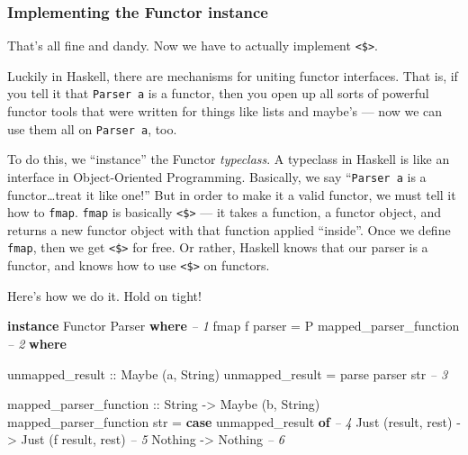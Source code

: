 \documentclass[]{article}
\newenvironment{Shaded}{}{}
\newcommand{\KeywordTok}[1]{\textcolor[rgb]{0.00,0.44,0.13}{\textbf{{#1}}}}
\newcommand{\DataTypeTok}[1]{\textcolor[rgb]{0.56,0.13,0.00}{{#1}}}
\newcommand{\CommentTok}[1]{\textcolor[rgb]{0.38,0.63,0.69}{\textit{{#1}}}}
\newcommand{\OtherTok}[1]{\textcolor[rgb]{0.00,0.44,0.13}{{#1}}}
\newcommand{\FunctionTok}[1]{\textcolor[rgb]{0.02,0.16,0.49}{{#1}}}
\newcommand{\NormalTok}[1]{{#1}}
\begin{document}
\subsubsection{Implementing the Functor
instance}\label{implementing-the-functor-instance}

That's all fine and dandy. Now we have to actually implement
\texttt{\textless{}\$\textgreater{}}.

Luckily in Haskell, there are mechanisms for uniting functor interfaces.
That is, if you tell it that \texttt{Parser\ a} is a functor, then you
open up all sorts of powerful functor tools that were written for things
like lists and maybe's --- now we can use them all on
\texttt{Parser\ a}, too.

To do this, we ``instance'' the Functor \emph{typeclass}. A typeclass in
Haskell is like an interface in Object-Oriented Programming. Basically,
we say ``\texttt{Parser\ a} is a functor\ldots{}treat it like one!'' But
in order to make it a valid functor, we must tell it how to
\texttt{fmap}. \texttt{fmap} is basically
\texttt{\textless{}\$\textgreater{}} --- it takes a function, a functor
object, and returns a new functor object with that function applied
``inside''. Once we define \texttt{fmap}, then we get
\texttt{\textless{}\$\textgreater{}} for free. Or rather, Haskell knows
that our parser is a functor, and knows how to use
\texttt{\textless{}\$\textgreater{}} on functors.

Here's how we do it. Hold on tight!

\begin{Shaded}
\begin{Highlighting}[]
\KeywordTok{instance} \DataTypeTok{Functor} \DataTypeTok{Parser} \KeywordTok{where}                                       \CommentTok{-- 1}
    \NormalTok{fmap f parser }\FunctionTok{=} \DataTypeTok{P} \NormalTok{mapped_parser_function                        }\CommentTok{-- 2}
        \KeywordTok{where}

\OtherTok{            unmapped_result ::} \DataTypeTok{Maybe} \NormalTok{(a, }\DataTypeTok{String}\NormalTok{)}
            \NormalTok{unmapped_result }\FunctionTok{=} \NormalTok{parse parser str                      }\CommentTok{-- 3}

\OtherTok{            mapped_parser_function ::} \DataTypeTok{String} \OtherTok{->} \DataTypeTok{Maybe} \NormalTok{(b, }\DataTypeTok{String}\NormalTok{)}
            \NormalTok{mapped_parser_function str }\FunctionTok{=}
                \KeywordTok{case} \NormalTok{unmapped_result }\KeywordTok{of}                             \CommentTok{-- 4}
                    \DataTypeTok{Just} \NormalTok{(result, rest) }\OtherTok{->} \DataTypeTok{Just} \NormalTok{(f result, rest)    }\CommentTok{-- 5}
                    \DataTypeTok{Nothing}             \OtherTok{->} \DataTypeTok{Nothing}                  \CommentTok{-- 6}
\end{Highlighting}
\end{Shaded}
\end{document}
